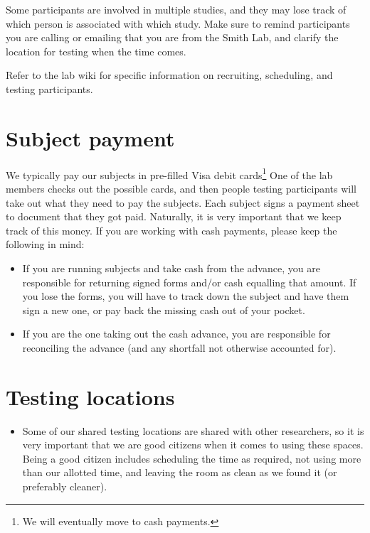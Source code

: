 \documentclass[letterpaper,12pt,oneside]{memoir}
\begin{document}
{Some participants are involved in multiple studies, and they may lose track of which person is associated with which study. Make sure to remind participants you are calling or emailing that you are from the Smith Lab, and clarify the location for testing when the time comes.

Refer to the lab wiki for specific information on recruiting, scheduling, and testing participants.


\section{Subject payment}
\label{sec:subject_payment}

We typically pay our subjects in pre-filled Visa debit cards\footnote{We will eventually move to cash payments.} One of the lab members checks out the possible cards, and then people testing participants will take out what they need to pay the subjects. Each subject signs a payment sheet to document that they got paid. Naturally, it is very important that we keep track of this money. If you are working with cash payments, please keep the following in mind:

\begin{itemize}

\item If you are running subjects and take cash from the advance, you are responsible for returning signed forms and/or cash equalling that amount. If you lose the forms, you will have to track down the subject and have them sign a new one, or pay back the missing cash out of your pocket.

\item If you are the one taking out the cash advance, you are responsible for reconciling the advance (and any shortfall not otherwise accounted for).

\end{itemize}



\section{Testing locations}
\label{sec:testing_locations}

\begin{itemize}
\item Some of our shared testing locations are shared with other researchers, so it is very important that we are good citizens when it comes to using these spaces. Being a good citizen includes scheduling the time as required, not using more than our allotted time, and leaving the room as clean as we found it (or preferably cleaner).


\end{itemize}}
\end{document}
